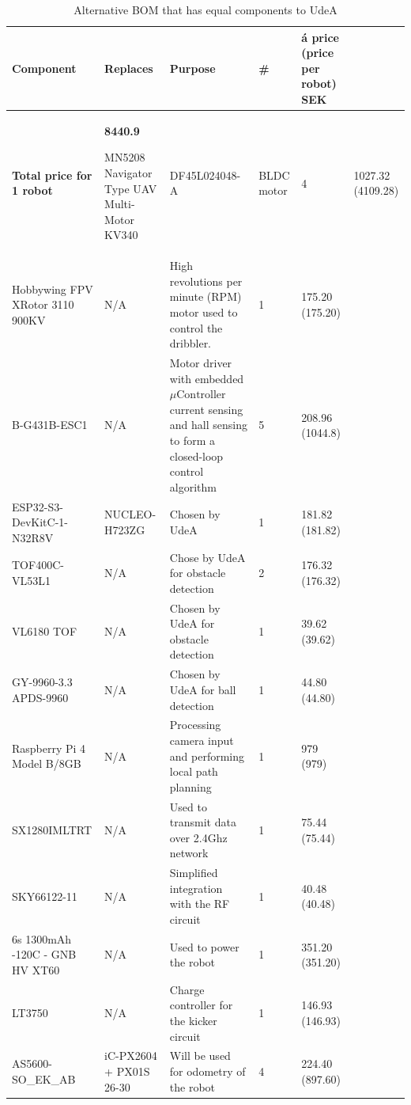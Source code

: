 \documentclass[a4paper,8pt]{article}
\begin{document}
  \begin{small}
    \begin{longtable}{|p{3cm}|p{3cm}|p{3cm}|p{1cm}|p{3cm}| }
      \caption{Alternative BOM that has equal components to UdeA} \\ \hline 
       \textbf{Component} & \textbf{Replaces} & \textbf{Purpose} & \textbf{\#} & \textbf{á price (price per robot) SEK}\\ \endhead \hline

       \textbf{Total price for 1 robot} & \textbf{8440.9} \endlastfoot \hline

      MN5208 Navigator Type UAV Multi-Motor KV340 & DF45L024048-A & BLDC motor & 4 & 1027.32 (4109.28)\\ \hline
      Hobbywing FPV XRotor 3110 900KV & N/A & High revolutions per minute (RPM) motor used to control the dribbler. & 1 & 175.20 (175.20) \\ \hline 
      B-G431B-ESC1 & N/A & Motor driver with embedded $\mu\text{Controller}$ current sensing and hall sensing to form a closed-loop control algorithm & 5 & 208.96 (1044.8)\\ \hline 
      ESP32-S3-DevKitC-1-N32R8V & NUCLEO-H723ZG & Chosen by UdeA & 1 & 181.82 (181.82) \\ \hline 
      TOF400C-VL53L1 & N/A & Chose by UdeA for obstacle detection & 2 & 176.32 (176.32) \\ \hline
      VL6180 TOF & N/A & Chosen by UdeA for obstacle detection & 1 & 39.62 (39.62) \\ \hline
      GY-9960-3.3 APDS-9960 & N/A & Chosen by UdeA for ball detection & 1 & 44.80 (44.80) \\ \hline
      Raspberry Pi 4 Model B/8GB & N/A & Processing camera input and performing local path planning & 1 & 979 (979) \\ \hline 
      SX1280IMLTRT & N/A & Used to transmit data over 2.4Ghz network & 1 & 75.44 (75.44) \\ \hline 
      SKY66122-11 & N/A & Simplified integration with the RF circuit & 1 & 40.48 (40.48) \\ \hline 
      6s 1300mAh -120C - GNB HV XT60 & N/A & Used to power the robot & 1 & 351.20 (351.20) \\ \hline 
      LT3750 & N/A & Charge controller for the kicker circuit & 1 & 146.93 (146.93)\\ \hline
      AS5600-SO\_EK\_AB & iC-PX2604 + PX01S 26-30 & Will be used for odometry of the robot & 4 & 224.40 (897.60) \\ \hline 

\end{longtable}
\end{small}
\end{document}
